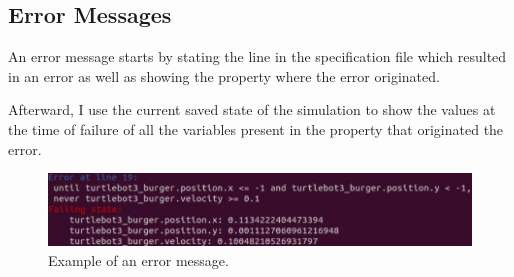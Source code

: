 \subsection{Error Messages}
\label{ssec:errormessages}

An error message starts by stating the line in the specification file which resulted in an error as well as showing the property where the error originated.

Afterward, I use the current saved state of the simulation to show the values at the time of failure of all the variables present in the property that originated the error.

\begin{figure}[htb]
\includegraphics[width=\textwidth]{images/error_message1.png}
\caption{Example of an error message.} \label{fig:monerror}
\end{figure}